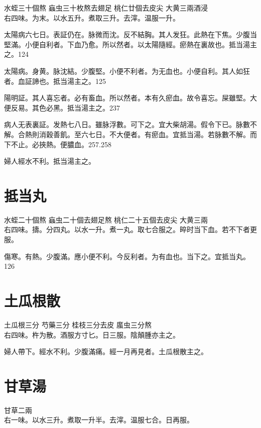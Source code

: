 水蛭{\scriptsize 三十個熬} 蝱虫{\scriptsize 三十枚熬去翅足} 桃仁{\scriptsize 廿個去皮尖} 大黄{\scriptsize 三兩酒浸}\\
右四味。为末。以水五升。煮取三升。去滓。温服一升。{\dengben}

太陽病六七日。表証仍在。脉微而沈。反不結胸。其人发狂。此熱在下焦。少腹当堅滿。小便自利者。下血乃愈。所以然者。以太陽隨經。瘀熱在裏故也。抵当湯主之。124

太陽病。身黄。脉沈結。少腹堅。小便不利者。为无血也。小便自利。其人如狂者。血証諦也。抵当湯主之。125

陽明証。其人喜忘者。必有畜血。所以然者。本有久瘀血。故令喜忘。屎雖堅。大便反易。其色必黑。抵当湯主之。237

病人无表裏証。发熱七八日。雖脉浮數。可下之。{\khaaitp 宜大柴胡湯。}假令下已。脉數不解。合熱則消穀善飢。至六七日。不大便者。有瘀血。宜抵当湯。若脉數不解。而下不止。必挾熱。便膿血。257.258

婦人經水不利。抵当湯主之。

\section{抵当丸}

水蛭{\scriptsize 二十個熬} 蝱虫{\scriptsize 二十個去翅足熬} 桃仁{\scriptsize 二十五個去皮尖} 大黄{\scriptsize 三兩}\\
右四味。擣。分四丸。以水一升。煮一丸。取七合服之。晬时当下血。若不下者更服。

傷寒。有熱。少腹滿。應小便不利。今反利者。为有血也。当下之。宜抵当丸。126

\section{土瓜根散}

土瓜根{\scriptsize 三分} 芍藥{\scriptsize 三分} 桂枝{\scriptsize 三分去皮} 䗪虫{\scriptsize 三分熬}\\
右四味。杵为散。酒服方寸匕。日三服。{\khaaitp 陰顛腫亦主之。}

{\khaaitp 婦人}帶下。經水不利。少腹滿痛。經一月再見者。土瓜根散主之。

\section{甘草湯}

甘草{\scriptsize 二兩}\\
右一味。以水三升。煮取一升半。去滓。温服七合。日再服。

